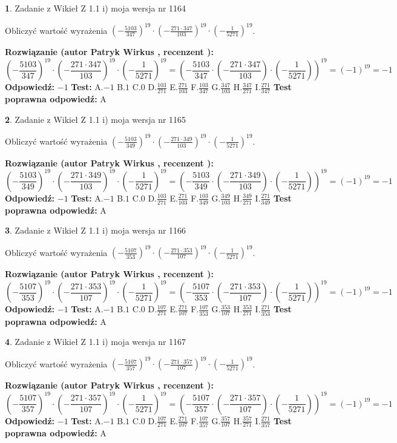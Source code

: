 \documentclass[12pt, a4paper]{article}
\theoremstyle{definition} %
\newtheorem{zad}{}
\newcommand{\zadStart}[1]{\begin{zad}#1\newline}
\newcommand{\zadStop}{\end{zad}}
\newcommand{\rozwStart}[2]{\noindent \textbf{Rozwiązanie (autor #1 , recenzent #2): }\newline}
\newcommand{\rozwStop}{\newline}
\newcommand{\odpStart}{\noindent \textbf{Odpowiedź:}\newline}
\newcommand{\odpStop}{\newline}
\newcommand{\testStart}{\noindent \textbf{Test:}\newline}
\newcommand{\testStop}{\newline}
\newcommand{\kluczStart}{\noindent \textbf{Test poprawna odpowiedź:}\newline}
\newcommand{\kluczStop}{\newline}
\begin{document}
\zadStart{Zadanie z Wikieł Z 1.1 i) moja wersja nr 1164}

Obliczyć wartość wyrażenia $(-\frac{5103}{347})^{19} \cdot (-\frac{271 \cdot 347}{103})^{19} \cdot (-\frac{1}{5271})^{19}$.
\zadStop
\rozwStart{Patryk Wirkus}{}
$$(-\frac{5103}{347})^{19} \cdot (-\frac{271 \cdot 347}{103})^{19} \cdot (-\frac{1}{5271})^{19} = (-\frac{5103}{347} \cdot (-\frac{271 \cdot 347}{103}) \cdot (-\frac{1}{5271}))^{19} = (-1)^{19} = -1$$
\rozwStop
\odpStart
$-1$
\odpStop
\testStart
A.$-1$ B.$1$ C.$0$ D.$\frac{103}{271}$ E.$\frac{271}{103}$
F.$\frac{103}{347}$ G.$\frac{347}{103}$
H.$\frac{347}{271}$
I.$\frac{271}{347}$
\testStop
\kluczStart
A
\kluczStop



\zadStart{Zadanie z Wikieł Z 1.1 i) moja wersja nr 1165}

Obliczyć wartość wyrażenia $(-\frac{5103}{349})^{19} \cdot (-\frac{271 \cdot 349}{103})^{19} \cdot (-\frac{1}{5271})^{19}$.
\zadStop
\rozwStart{Patryk Wirkus}{}
$$(-\frac{5103}{349})^{19} \cdot (-\frac{271 \cdot 349}{103})^{19} \cdot (-\frac{1}{5271})^{19} = (-\frac{5103}{349} \cdot (-\frac{271 \cdot 349}{103}) \cdot (-\frac{1}{5271}))^{19} = (-1)^{19} = -1$$
\rozwStop
\odpStart
$-1$
\odpStop
\testStart
A.$-1$ B.$1$ C.$0$ D.$\frac{103}{271}$ E.$\frac{271}{103}$
F.$\frac{103}{349}$ G.$\frac{349}{103}$
H.$\frac{349}{271}$
I.$\frac{271}{349}$
\testStop
\kluczStart
A
\kluczStop



\zadStart{Zadanie z Wikieł Z 1.1 i) moja wersja nr 1166}

Obliczyć wartość wyrażenia $(-\frac{5107}{353})^{19} \cdot (-\frac{271 \cdot 353}{107})^{19} \cdot (-\frac{1}{5271})^{19}$.
\zadStop
\rozwStart{Patryk Wirkus}{}
$$(-\frac{5107}{353})^{19} \cdot (-\frac{271 \cdot 353}{107})^{19} \cdot (-\frac{1}{5271})^{19} = (-\frac{5107}{353} \cdot (-\frac{271 \cdot 353}{107}) \cdot (-\frac{1}{5271}))^{19} = (-1)^{19} = -1$$
\rozwStop
\odpStart
$-1$
\odpStop
\testStart
A.$-1$ B.$1$ C.$0$ D.$\frac{107}{271}$ E.$\frac{271}{107}$
F.$\frac{107}{353}$ G.$\frac{353}{107}$
H.$\frac{353}{271}$
I.$\frac{271}{353}$
\testStop
\kluczStart
A
\kluczStop



\zadStart{Zadanie z Wikieł Z 1.1 i) moja wersja nr 1167}

Obliczyć wartość wyrażenia $(-\frac{5107}{357})^{19} \cdot (-\frac{271 \cdot 357}{107})^{19} \cdot (-\frac{1}{5271})^{19}$.
\zadStop
\rozwStart{Patryk Wirkus}{}
$$(-\frac{5107}{357})^{19} \cdot (-\frac{271 \cdot 357}{107})^{19} \cdot (-\frac{1}{5271})^{19} = (-\frac{5107}{357} \cdot (-\frac{271 \cdot 357}{107}) \cdot (-\frac{1}{5271}))^{19} = (-1)^{19} = -1$$
\rozwStop
\odpStart
$-1$
\odpStop
\testStart
A.$-1$ B.$1$ C.$0$ D.$\frac{107}{271}$ E.$\frac{271}{107}$
F.$\frac{107}{357}$ G.$\frac{357}{107}$
H.$\frac{357}{271}$
I.$\frac{271}{357}$
\testStop
\kluczStart
A
\kluczStop
\end{document}
